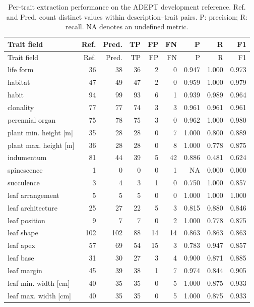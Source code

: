 \begingroup
\small
\setlength{\tabcolsep}{3pt}
\begin{longtable}{p{}rrrrrrrr}
\caption{Per-trait extraction performance on the ADEPT development reference. Ref. and Pred. count distinct values within description--trait pairs. P: precision; R: recall. NA denotes an undefined metric.}\label{tab:adept-per-trait}\\
\hline
Trait field & Ref. & Pred. & TP & FP & FN & P & R & F1 \\
\hline
\endfirsthead
\hline
Trait field & Ref. & Pred. & TP & FP & FN & P & R & F1 \\
\hline
\endhead
\hline
\endfoot
life form & 36 & 38 & 36 & 2 & 0 & 0.947 & 1.000 & 0.973 \\
habitat & 47 & 49 & 47 & 2 & 0 & 0.959 & 1.000 & 0.979 \\
habit & 94 & 99 & 93 & 6 & 1 & 0.939 & 0.989 & 0.964 \\
clonality & 77 & 77 & 74 & 3 & 3 & 0.961 & 0.961 & 0.961 \\
perennial organ & 75 & 78 & 75 & 3 & 0 & 0.962 & 1.000 & 0.980 \\
plant min. height [m] & 35 & 28 & 28 & 0 & 7 & 1.000 & 0.800 & 0.889 \\
plant max. height [m] & 36 & 28 & 28 & 0 & 8 & 1.000 & 0.778 & 0.875 \\
indumentum & 81 & 44 & 39 & 5 & 42 & 0.886 & 0.481 & 0.624 \\
spinescence & 1 & 0 & 0 & 0 & 1 & NA & 0.000 & 0.000 \\
succulence & 3 & 4 & 3 & 1 & 0 & 0.750 & 1.000 & 0.857 \\
leaf arrangement & 5 & 5 & 5 & 0 & 0 & 1.000 & 1.000 & 1.000 \\
leaf architecture & 25 & 27 & 22 & 5 & 3 & 0.815 & 0.880 & 0.846 \\
leaf position & 9 & 7 & 7 & 0 & 2 & 1.000 & 0.778 & 0.875 \\
leaf shape & 102 & 102 & 88 & 14 & 14 & 0.863 & 0.863 & 0.863 \\
leaf apex & 57 & 69 & 54 & 15 & 3 & 0.783 & 0.947 & 0.857 \\
leaf base & 31 & 30 & 27 & 3 & 4 & 0.900 & 0.871 & 0.885 \\
leaf margin & 45 & 39 & 38 & 1 & 7 & 0.974 & 0.844 & 0.905 \\
leaf min. width [cm] & 40 & 35 & 35 & 0 & 5 & 1.000 & 0.875 & 0.933 \\
leaf max. width [cm] & 40 & 35 & 35 & 0 & 5 & 1.000 & 0.875 & 0.933 \\

\end{longtable}
